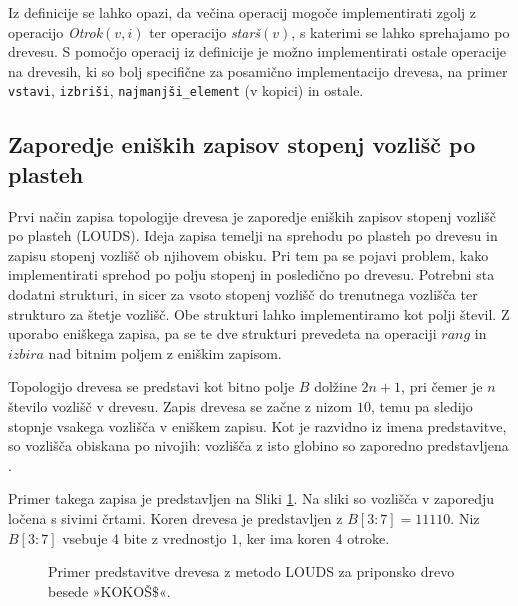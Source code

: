 Iz definicije se lahko opazi, da večina operacij  mogoče implementirati zgolj z operacijo \textit{Otrok}$(v,i)$ ter operacijo \textit{starš}$(v)$, s katerimi se lahko sprehajamo po drevesu. S pomočjo operacij iz definicije je možno implementirati ostale operacije na drevesih, ki so bolj specifične za posamično implementacijo drevesa, na primer \texttt{vstavi}, \texttt{izbriši}, \texttt{najmanjši\_element} (v kopici) in ostale.

\subsection{Zaporedje eniških zapisov stopenj vozlišč po plasteh}\label{sec:LOUDS}

Prvi način zapisa topologije drevesa je zaporedje eniških zapisov stopenj vozlišč po plasteh (LOUDS). Ideja zapisa temelji na sprehodu po plasteh po drevesu in zapisu stopenj vozlišč ob njihovem obisku. Pri tem pa se pojavi problem, kako implementirati sprehod po polju stopenj in posledično po drevesu. Potrebni sta dodatni strukturi, in sicer za vsoto stopenj vozlišč do trenutnega vozlišča ter strukturo za štetje vozlišč. Obe strukturi lahko implementiramo kot polji števil. Z uporabo eniškega zapisa, pa se te dve strukturi prevedeta na operaciji $rang$ in $izbira$ nad bitnim poljem z eniškim zapisom.    

Topologijo drevesa se predstavi kot bitno polje $B$ dolžine $2n+1$, pri čemer je $n$ število vozlišč v drevesu. Zapis drevesa se začne z nizom $10$, temu pa sledijo stopnje vsakega vozlišča v eniškem zapisu. Kot je razvidno iz imena predstavitve, so vozlišča obiskana po nivojih: vozlišča z isto globino so zaporedno predstavljena \cite{Navarro2016}.

Primer takega zapisa je predstavljen na Sliki \ref{fig:LOUDS}. Na sliki so vozlišča v zaporedju ločena s sivimi črtami. Koren drevesa je predstavljen z $B[3:7]=11110$. Niz $B[3:7]$ vsebuje 4 bite z vrednostjo $1$, ker ima koren $4$ otroke.

\begin{figure}[htb]
    \begin{center}
        
        \caption{Primer predstavitve drevesa z metodo LOUDS za priponsko drevo besede »KOKOŠ$\$$«.} 
        \label{fig:LOUDS}
    \end{center}
\end{figure}

